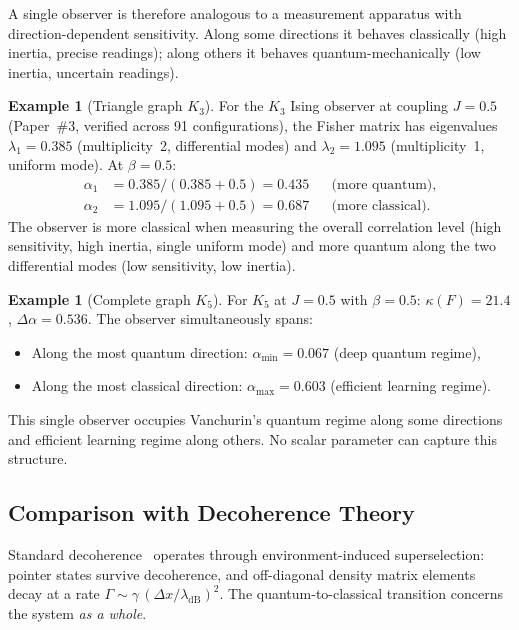 \documentclass[11pt,a4paper]{article}
\theoremstyle{plain}
\theoremstyle{definition}
\newtheorem{example}[theorem]{Example}
\begin{document}
A single observer is therefore analogous to a measurement
apparatus with direction-dependent sensitivity.  Along some
directions it behaves classically (high inertia, precise
readings); along others it behaves quantum-mechanically
(low inertia, uncertain readings).

\begin{example}[Triangle graph $K_3$]
\label{ex:K3}
For the $K_3$ Ising observer at coupling $J = 0.5$
(Paper~\#3, verified across 91 configurations), the Fisher
matrix has eigenvalues $\lambda_1 = 0.385$ (multiplicity~2,
differential modes) and $\lambda_2 = 1.095$ (multiplicity~1,
uniform mode).  At $\beta = 0.5$:
\begin{align*}
\alpha_1 &= 0.385/(0.385 + 0.5) = 0.435
  &&\text{(more quantum)}, \\
\alpha_2 &= 1.095/(1.095 + 0.5) = 0.687
  &&\text{(more classical)}.
\end{align*}
The observer is more classical when measuring the overall
correlation level (high sensitivity, high inertia, single
uniform mode) and more quantum along the two differential
modes (low sensitivity, low inertia).
\end{example}

\begin{example}[Complete graph $K_5$]
\label{ex:K5}
For $K_5$ at $J = 0.5$ with $\beta = 0.5$: $\kappa(F) = 21.4$,
$\Delta\alpha = 0.536$.  The observer simultaneously spans:
\begin{itemize}[noitemsep]
\item Along the most quantum direction: $\alpha_{\min} = 0.067$
  (deep quantum regime),
\item Along the most classical direction: $\alpha_{\max} = 0.603$
  (efficient learning regime).
\end{itemize}
This single observer occupies Vanchurin's quantum regime along
some directions and efficient learning regime along others.
No scalar parameter can capture this structure.
\end{example}


\subsection{Comparison with Decoherence Theory}

Standard decoherence~\cite{zurek2003decoherence, joos1985emergence}
operates through environment-induced superselection: pointer
states survive decoherence, and off-diagonal density matrix elements
decay at a rate $\Gamma \sim \gamma\,(\Delta x/\lambda_{\mathrm{dB}})^2$.
The quantum-to-classical transition concerns the system \emph{as a
whole}.
\end{document}
